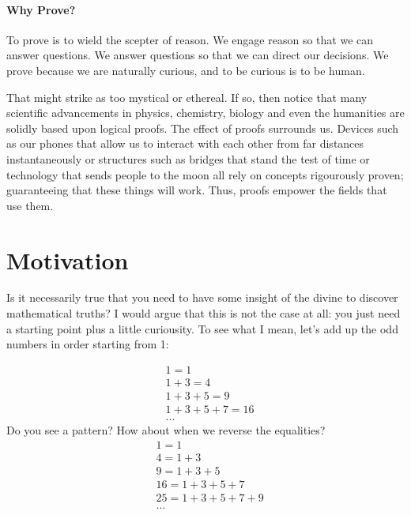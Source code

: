 \documentclass[../proofs.tex]{subfiles}
\begin{document}
\paragraph{Why Prove?} To prove is to wield the scepter of reason. We engage
reason so that we can answer questions. We answer questions so that we can
direct our decisions. We prove because we are naturally curious, and to be
curious is to be human.

That might strike as too mystical or ethereal. If so, then notice that many
scientific advancements in physics, chemistry, biology and even the humanities
are solidly based upon logical proofs. The effect of proofs surrounds us.
Devices such as our phones that allow us to interact with each other from far
distances instantaneously or structures such as bridges that stand the test of
time or technology that sends people to the moon all rely on concepts
rigourously proven; guaranteeing that these things will work. Thus, proofs
empower the fields that use them.


\section{Motivation}
Is it necessarily true that you need to have some insight of the divine to discover mathematical
truths? I would argue that this is not the case at all: you just need a starting point plus a 
little curiousity. To see what I mean, let's add up the odd numbers in order starting from 1:

\begin{align*}
  &1 = 1 \\
  &1 + 3 = 4 \\
  &1 + 3 + 5 = 9 \\
  &1 + 3 + 5 + 7 = 16 \\
  &... 
\end{align*}
Do you see a pattern? How about when we reverse the equalities?
\begin{align*}
  &1 = 1 \\
  &4 = 1 + 3 \\
  &9 = 1 + 3 + 5 \\
  &16 = 1 + 3 + 5 + 7 \\
  &25 = 1 + 3 + 5 + 7 + 9 \\
  &... 
\end{align*}
\end{document}

